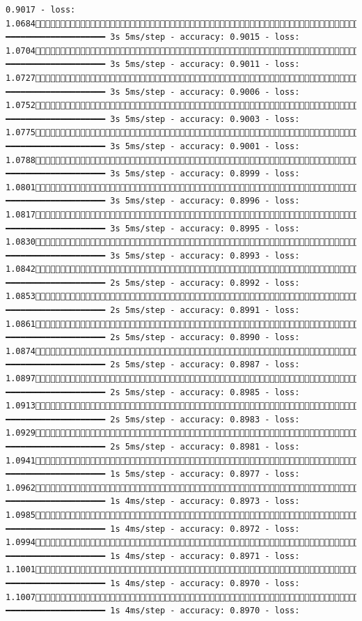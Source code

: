 \documentclass[
  letterpaper,
  DIV=11,
  numbers=noendperiod]{scrartcl}
\begin{document}
\begin{verbatim}
0.9017 - loss: 1.0684231/858 ━━━━━━━━━━━━━━━━━━━━ 3s 5ms/step - accuracy: 0.9015 - loss: 1.0704245/858 ━━━━━━━━━━━━━━━━━━━━ 3s 5ms/step - accuracy: 0.9011 - loss: 1.0727256/858 ━━━━━━━━━━━━━━━━━━━━ 3s 5ms/step - accuracy: 0.9006 - loss: 1.0752266/858 ━━━━━━━━━━━━━━━━━━━━ 3s 5ms/step - accuracy: 0.9003 - loss: 1.0775272/858 ━━━━━━━━━━━━━━━━━━━━ 3s 5ms/step - accuracy: 0.9001 - loss: 1.0788279/858 ━━━━━━━━━━━━━━━━━━━━ 3s 5ms/step - accuracy: 0.8999 - loss: 1.0801288/858 ━━━━━━━━━━━━━━━━━━━━ 3s 5ms/step - accuracy: 0.8996 - loss: 1.0817297/858 ━━━━━━━━━━━━━━━━━━━━ 3s 5ms/step - accuracy: 0.8995 - loss: 1.0830306/858 ━━━━━━━━━━━━━━━━━━━━ 3s 5ms/step - accuracy: 0.8993 - loss: 1.0842316/858 ━━━━━━━━━━━━━━━━━━━━ 2s 5ms/step - accuracy: 0.8992 - loss: 1.0853323/858 ━━━━━━━━━━━━━━━━━━━━ 2s 5ms/step - accuracy: 0.8991 - loss: 1.0861337/858 ━━━━━━━━━━━━━━━━━━━━ 2s 5ms/step - accuracy: 0.8990 - loss: 1.0874365/858 ━━━━━━━━━━━━━━━━━━━━ 2s 5ms/step - accuracy: 0.8987 - loss: 1.0897383/858 ━━━━━━━━━━━━━━━━━━━━ 2s 5ms/step - accuracy: 0.8985 - loss: 1.0913403/858 ━━━━━━━━━━━━━━━━━━━━ 2s 5ms/step - accuracy: 0.8983 - loss: 1.0929420/858 ━━━━━━━━━━━━━━━━━━━━ 2s 5ms/step - accuracy: 0.8981 - loss: 1.0941446/858 ━━━━━━━━━━━━━━━━━━━━ 1s 5ms/step - accuracy: 0.8977 - loss: 1.0962474/858 ━━━━━━━━━━━━━━━━━━━━ 1s 4ms/step - accuracy: 0.8973 - loss: 1.0985488/858 ━━━━━━━━━━━━━━━━━━━━ 1s 4ms/step - accuracy: 0.8972 - loss: 1.0994501/858 ━━━━━━━━━━━━━━━━━━━━ 1s 4ms/step - accuracy: 0.8971 - loss: 1.1001514/858 ━━━━━━━━━━━━━━━━━━━━ 1s 4ms/step - accuracy: 0.8970 - loss: 1.1007522/858 ━━━━━━━━━━━━━━━━━━━━ 1s 4ms/step - accuracy: 0.8970 - loss: 
\end{verbatim}
\end{document}

